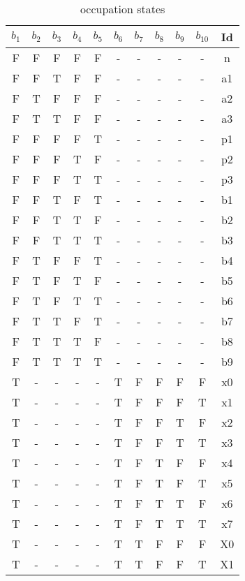 \begin{table} [!ht]
\caption { occupation states}
\begin{center}
\tiny
\begin{tabular}[hbt]{|c|c|c|c|c|c|c|c|c|c|c|} 
\hline
$b_1$ & $b_2$ & $b_3$ & $b_4$ & $b_5$ & $b_6$ & $b_7$ & $b_8$ & $b_9$ & $b_{10}$ &Id \\
\hline
F & F & F & F & F & - & - & - & - & - & n \\
\hline
F & F & T & F & F & - & - & - & - & - & a1 \\
F & T & F & F & F & - & - & - & - & - & a2 \\
F & T & T & F & F & - & - & - &- & - & a3 \\
\hline
F & F & F & F & T & - & - & - & - & - & p1 \\
F & F & F & T & F & - & - & - & - & - & p2 \\
F & F & F & T & T & - & - & - & - & - & p3 \\
\hline
F & F & T & F & T & - & - & - &- & - & b1 \\
F & F & T & T & F & - & - & - & - & - & b2 \\
F & F & T & T & T & - & - & - & - & - & b3 \\
F & T & F & F & T & - & - & - & - & - & b4 \\
F & T & F & T & F & - & - & - & - & - & b5 \\
F & T & F & T & T & - & - & - & - & - & b6 \\
F & T & T & F & T & - & - & - & - & - & b7 \\
F & T & T & T & F & - & - & - & - & - & b8 \\
F & T & T & T & T & - & - & - & - & - & b9 \\
\hline
T & - & - & - & - & T & F & F & F & F & x0 \\
T & - & - & - & - & T & F & F & F & T & x1 \\
T & - & - & - & - & T & F & F & T & F & x2 \\
T & - & - & - & - & T & F & F & T & T & x3 \\
T & - & - & - & - & T & F & T & F & F & x4 \\
T & - & - & - & - & T & F & T & F & T & x5 \\
T & - & - & - & - & T & F & T & T & F & x6 \\
T & - & - & - & - & T & F & T & T & T & x7 \\
T & - & - & - & - & T & T & F & F & F & X0 \\
T & - & - & - & - & T & T & F & F & T & X1 \\

\end{tabular}
\end{center}
\end{table}
